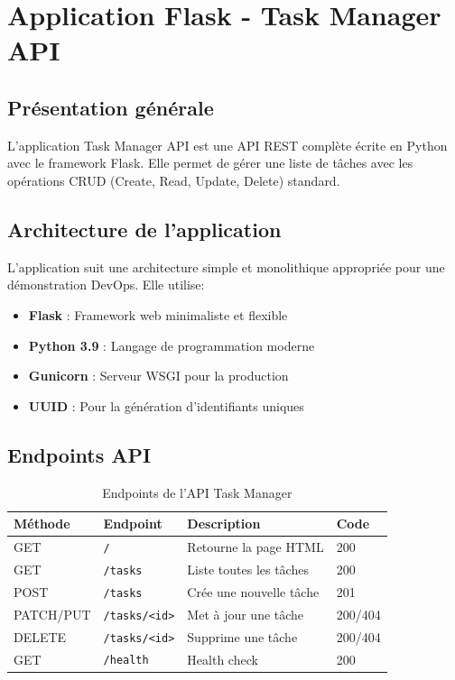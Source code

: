 \documentclass[12pt,a4paper,twoside]{report}
\begin{document}
\newpage

\chapter{Application Flask - Task Manager API}

\section{Présentation générale}

L'application Task Manager API est une API REST complète écrite en Python avec le framework Flask. Elle permet de gérer une liste de tâches avec les opérations CRUD (Create, Read, Update, Delete) standard.

\section{Architecture de l'application}

L'application suit une architecture simple et monolithique appropriée pour une démonstration DevOps. Elle utilise:
\begin{itemize}
    \item \textbf{Flask} : Framework web minimaliste et flexible
    \item \textbf{Python 3.9} : Langage de programmation moderne
    \item \textbf{Gunicorn} : Serveur WSGI pour la production
    \item \textbf{UUID} : Pour la génération d'identifiants uniques
\end{itemize}

\section{Endpoints API}

\begin{table}[H]
    \centering
    \caption{Endpoints de l'API Task Manager}
    \begin{tabular}{|l|l|l|p{4cm}|}
        \hline
        \textbf{Méthode} & \textbf{Endpoint} & \textbf{Description} & \textbf{Code} \\
        \hline
        GET & \texttt{/} & Retourne la page HTML & 200 \\
        GET & \texttt{/tasks} & Liste toutes les tâches & 200 \\
        POST & \texttt{/tasks} & Crée une nouvelle tâche & 201 \\
        PATCH/PUT & \texttt{/tasks/<id>} & Met à jour une tâche & 200/404 \\
        DELETE & \texttt{/tasks/<id>} & Supprime une tâche & 200/404 \\
        GET & \texttt{/health} & Health check & 200 \\
        \hline
    \end{tabular}
\end{table}
\end{document}
